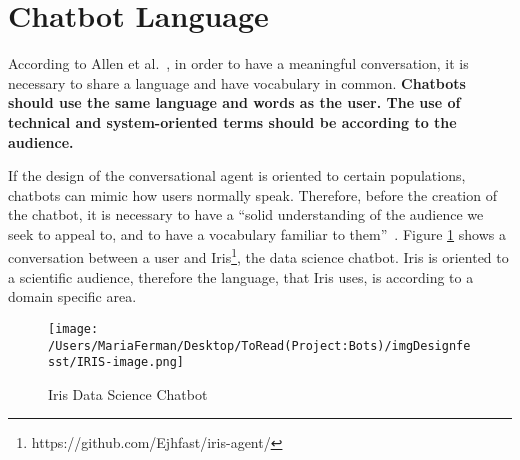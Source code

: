 \documentclass[a4paper,10pt]{article}
\begin{document}

\section{Chatbot Language}
According to Allen et al.~\cite{allen1978conversation}, in order to have a meaningful conversation, it is necessary to share a language and have vocabulary in common. \textbf{Chatbots should use the same language and words as the user. The use of technical and system-oriented terms should be according to the audience.} 

 If the design of the conversational agent is oriented to certain populations, chatbots can mimic how users normally speak.  Therefore, before the creation of the chatbot, it is necessary to have a ``solid understanding of the audience we seek to appeal to, and to have a vocabulary familiar to them”~\cite{HeuristicsWebPage}. Figure \ref{FigureIRIS} shows a conversation between a user and Iris\footnote{https://github.com/Ejhfast/iris-agent/}, the data science chatbot. Iris is oriented to a scientific audience, therefore the language, that Iris uses, is according to a domain specific area.  

\begin{figure}
\centering
\texttt{[image: /Users/MariaFerman/Desktop/ToRead(Project:Bots)/imgDesignfesst/IRIS-image.png]}
\caption{Iris Data Science Chatbot}
\label{FigureIRIS}
\end{figure}
\end{document}
